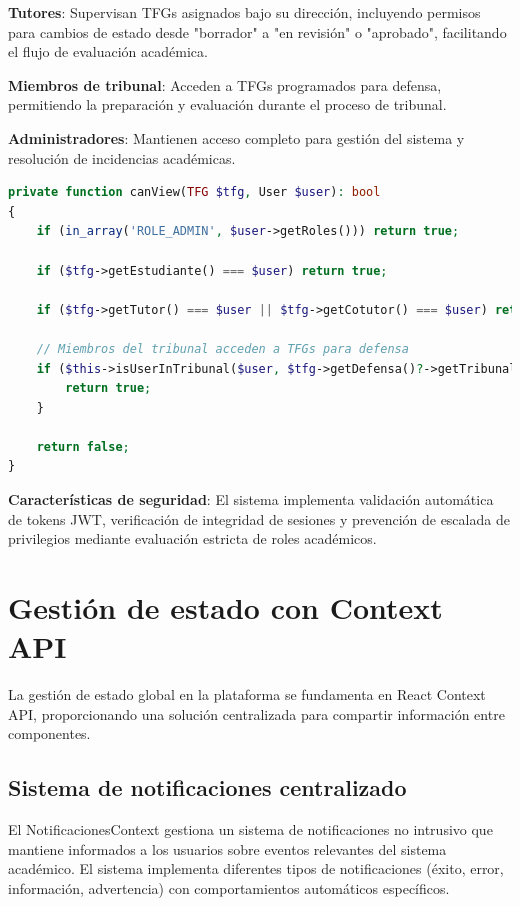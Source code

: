 \documentclass[12pt,a4paper,oneside]{report}
\begin{document}
\textbf{Tutores}: Supervisan TFGs asignados bajo su dirección, incluyendo permisos para cambios de estado desde "borrador" a "en revisión" o "aprobado", facilitando el flujo de evaluación académica.

\textbf{Miembros de tribunal}: Acceden a TFGs programados para defensa, permitiendo la preparación y evaluación durante el proceso de tribunal.

\textbf{Administradores}: Mantienen acceso completo para gestión del sistema y resolución de incidencias académicas.

\begin{lstlisting}[language=PHP]
private function canView(TFG $tfg, User $user): bool
{
    if (in_array('ROLE_ADMIN', $user->getRoles())) return true;

    if ($tfg->getEstudiante() === $user) return true;

    if ($tfg->getTutor() === $user || $tfg->getCotutor() === $user) return true;

    // Miembros del tribunal acceden a TFGs para defensa
    if ($this->isUserInTribunal($user, $tfg->getDefensa()?->getTribunal())) {
        return true;
    }

    return false;
}
\end{lstlisting}

\textbf{Características de seguridad}: El sistema implementa validación automática de tokens JWT, verificación de integridad de sesiones y prevención de escalada de privilegios mediante evaluación estricta de roles académicos.

\section{Gestión de estado con Context API}\label{gestiuxf3n-de-estado-con-context-api}

La gestión de estado global en la plataforma se fundamenta en React Context API, proporcionando una solución centralizada para compartir información entre componentes.

\subsection{Sistema de notificaciones centralizado}\label{notificacionescontext}

El NotificacionesContext gestiona un sistema de notificaciones no intrusivo que mantiene informados a los usuarios sobre eventos relevantes del sistema académico. El sistema implementa diferentes tipos de notificaciones (éxito, error, información, advertencia) con comportamientos automáticos específicos.
\end{document}
